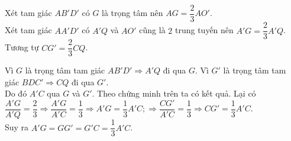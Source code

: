 \begin{ex}
{		Xét tam  giác $AB'D'$ có $G$ là trọng tâm nên $AG=\dfrac{2}{3}AO'$.\\
		Xét tam giác $AA'D'$  có $A'Q$ và $AO'$ cũng là $2$ trung tuyến nên $A'G=\dfrac{2}{3}A'Q$.\\
		 Tương tự $CG'=\dfrac{2}{3}CQ$.\\
		\begin{itemchoice}
			\itemch Vì $G$ là  trọng tâm tam giác $AB'D'\Rightarrow A'Q$ đi qua $G$.
			\itemch Vì $G'$ là trọng tâm tam giác $BDC'\Rightarrow CQ$ đi  qua $G'$.\\
			Do  đó $A'C$ qua $G$ và $G'$.
			\itemch Theo chứng minh trên  ta có kết quả.
			\itemch Lại có  $\dfrac{A'G}{A'Q}=\dfrac{2}{3} \Rightarrow \dfrac{A'G}{A'C}=\dfrac{1}{3} \Rightarrow A'G=\dfrac{1}{3} A'C;\Rightarrow \dfrac{CG'}{A'C}=\dfrac{1}{3} \Rightarrow CG'=\dfrac{1}{3} A'C$.\\
			Suy ra  $A'G =GG'=G'C=\dfrac{1}{3}A'C$.
		\end{itemchoice}
	 }
\end{ex}

